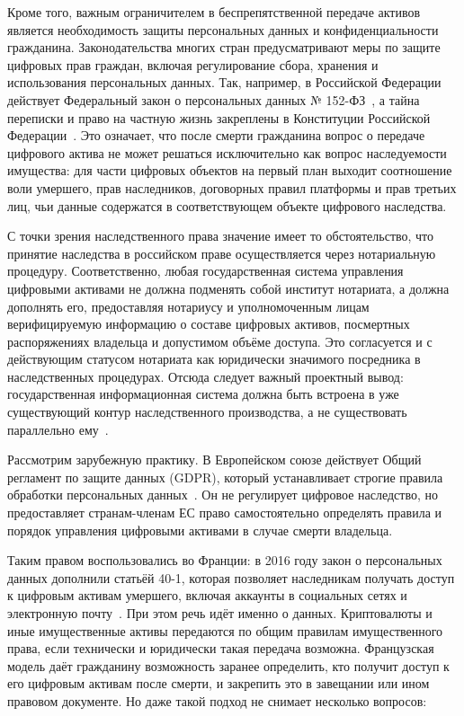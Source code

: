 Кроме того, важным ограничителем в беспрепятственной передаче активов является необходимость защиты персональных данных и конфиденциальности гражданина. Законодательства многих стран предусматривают меры по защите цифровых прав граждан, включая регулирование сбора, хранения и использования персональных данных. Так, например, в Российской Федерации действует Федеральный закон о персональных данных № 152-ФЗ~\cite{federalLaw152FZ_2006}, а тайна переписки и право на частную жизнь закреплены в Конституции Российской Федерации~\cite{constitutionRu}. Это означает, что после смерти гражданина вопрос о передаче цифрового актива не может решаться исключительно как вопрос наследуемости имущества: для части цифровых объектов на первый план выходит соотношение воли умершего, прав наследников, договорных правил платформы и прав третьих лиц, чьи данные содержатся в соответствующем объекте цифрового наследства.

С точки зрения наследственного права значение имеет то обстоятельство, что принятие наследства в российском праве осуществляется через нотариальную процедуру. Соответственно, любая государственная система управления цифровыми активами не должна подменять собой институт нотариата, а должна дополнять его, предоставляя нотариусу и уполномоченным лицам верифицируемую информацию о составе цифровых активов, посмертных распоряжениях владельца и допустимом объёме доступа. Это согласуется и с действующим статусом нотариата как юридически значимого посредника в наследственных процедурах. Отсюда следует важный проектный вывод: государственная информационная система должна быть встроена в уже существующий контур наследственного производства, а не существовать параллельно ему~\cite{Haritonova2024HSE}.

Рассмотрим зарубежную практику. В Европейском союзе действует Общий регламент по защите данных (GDPR), который устанавливает строгие правила обработки персональных данных~\cite{gdprReg2016_679}. Он не регулирует цифровое наследство, но предоставляет странам-членам ЕС право самостоятельно определять правила и порядок управления цифровыми активами в случае смерти владельца.

Таким правом воспользовались во Франции: в 2016 году закон о персональных данных дополнили статьёй 40-1, которая позволяет наследникам получать доступ к цифровым активам умершего, включая аккаунты в социальных сетях и электронную почту~\cite{FrenchDigitalInheritanceLaw2016}. При этом речь идёт именно о данных. Криптовалюты и иные имущественные активы передаются по общим правилам имущественного права, если технически и юридически такая передача возможна. Французская модель даёт гражданину возможность заранее определить, кто получит доступ к его цифровым активам после смерти, и закрепить это в завещании или ином правовом документе. Но даже такой подход не снимает несколько вопросов:

